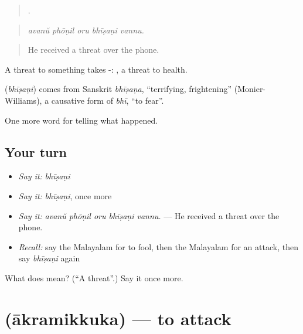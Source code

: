 \begin{quote}
    .
\end{quote}

\begin{quote}
\emph{avanŭ phōṇil oru bhīṣaṇi vannu.}
\end{quote}

\begin{quote}
He received a threat over the phone.
\end{quote}

A threat to something takes -:  , a threat to health.

\begin{cousinweb}
\textbf{} (\emph{bhīṣaṇi}) comes from Sanskrit \emph{bhīṣaṇa}, \textquotedblleft{}terrifying, frightening\textquotedblright{} (Monier-Williams), a causative form of \emph{bhī}, \textquotedblleft{}to fear\textquotedblright{}.
\end{cousinweb}

\begin{grammarlens}[title={What you've built}]
One more word for telling what happened.
\end{grammarlens}

\subsection*{Your turn}
\begin{itemize}
\raggedright
  \item \emph{Say it:} \emph{bhīṣaṇi}
  \item \emph{Say it:} \emph{bhīṣaṇi}, once more
  \item \emph{Say it:} \emph{avanŭ phōṇil oru bhīṣaṇi vannu.} — He received a threat over the phone.
  \item \emph{Recall:} say the Malayalam for to fool, then the Malayalam for an attack, then say \emph{bhīṣaṇi} again
\end{itemize}

\begin{tcolorbox}[breakable,colback=teal!4,colframe=teal!35!black,title={Before you move on}]
What does  mean? (\textquotedblleft{}A threat\textquotedblright{}.) Say it once more.
\end{tcolorbox}
\section[\texorpdfstring{\ml{ആക്രമിക്കുക} (ākramikkuka)}{ആക്രമിക്കുക (ākramikkuka)}]{ (ākramikkuka) — to attack}

